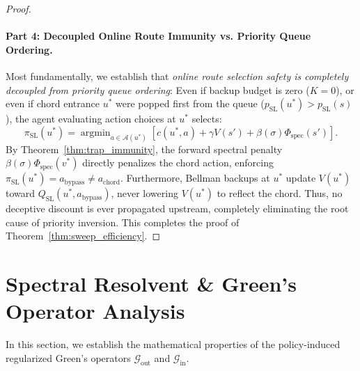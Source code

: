 \documentclass[11pt,a4paper]{article}
\begin{document}
\begin{proof}
\paragraph{Part 4: Decoupled Online Route Immunity vs. Priority Queue Ordering.}
Most fundamentally, we establish that \textit{online route selection safety is completely decoupled from priority queue ordering}:
Even if backup budget is zero ($K = 0$), or even if chord entrance $u^*$ were popped first from the queue ($p_{\text{SL}}(u^*) > p_{\text{SL}}(s)$), the agent evaluating action choices at $u^*$ selects:
\begin{equation}
\pi_{\text{SL}}(u^*) = \operatorname{argmin}_{a \in \mathcal{A}(u^*)} \left[ c(u^*, a) + \gamma V(s') + \beta(\sigma) \Phi_{\text{spec}}(s') \right].
\end{equation}
By Theorem~\ref{thm:trap_immunity}, the forward spectral penalty $\beta(\sigma) \Phi_{\text{spec}}(v^*)$ directly penalizes the chord action, enforcing $\pi_{\text{SL}}(u^*) = a_{\text{bypass}} \ne a_{\text{chord}}$. Furthermore, Bellman backups at $u^*$ update $V(u^*)$ toward $Q_{\text{SL}}(u^*, a_{\text{bypass}})$, never lowering $V(u^*)$ to reflect the chord. Thus, no deceptive discount is ever propagated upstream, completely eliminating the root cause of priority inversion. This completes the proof of Theorem~\ref{thm:sweep_efficiency}.
\end{proof}

\section{Spectral Resolvent \& Green's Operator Analysis}
\label{sec:appendix_spectral}

In this section, we establish the mathematical properties of the policy-induced regularized Green's operators $\mathcal{G}_{\text{out}}$ and $\mathcal{G}_{\text{in}}$.
\end{document}
